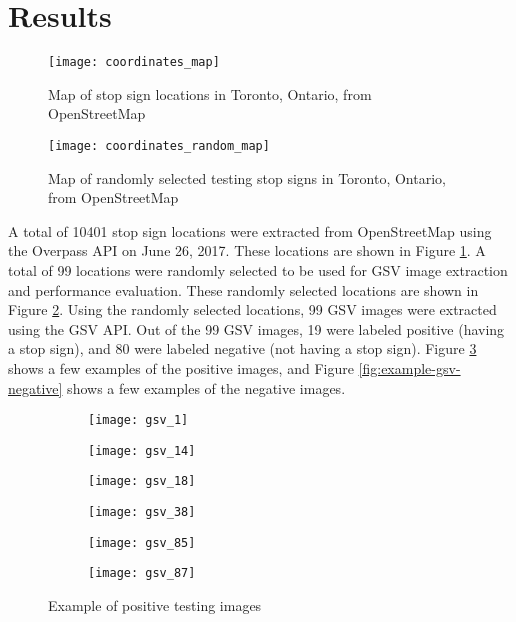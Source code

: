 \section{Results} \label{results}

\begin{figure}[H]
  \texttt{[image: coordinates\_map]}
  \caption{Map of stop sign locations in Toronto, Ontario, from OpenStreetMap}
  \label{fig:map-stop-signs}
\end{figure}

\begin{figure}[H]
  \texttt{[image: coordinates\_random\_map]}
  \caption{Map of randomly selected testing stop signs in Toronto, Ontario, from OpenStreetMap}
  \label{fig:map-random}
\end{figure}

A total of 10401 stop sign locations were extracted from OpenStreetMap using the Overpass API on June 26, 2017. These locations  are shown in Figure \ref{fig:map-stop-signs}. A total of 99 locations were randomly selected to be used for GSV image extraction and performance evaluation. These randomly selected locations are shown in Figure \ref{fig:map-random}. Using the randomly selected locations, 99 GSV images were extracted using the GSV API. Out of the 99 GSV images, 19 were labeled positive (having a stop sign), and 80 were labeled negative (not having a stop sign). Figure \ref{fig:example-gsv-positive} shows a few examples of the positive images, and Figure \ref{fig:example-gsv-negative} shows a few examples of the negative images.

\begin{figure}[H]
  \begin{subfigure}[t]{1.5in}
    \texttt{[image: gsv\_1]}
  \end{subfigure}
  \hfill
  \begin{subfigure}[t]{1.5in}
    \texttt{[image: gsv\_14]}
  \end{subfigure}
  \hfill
  \begin{subfigure}[t]{1.5in}
    \texttt{[image: gsv\_18]}
  \end{subfigure}
  \par\medskip
  \begin{subfigure}[t]{1.5in}
    \texttt{[image: gsv\_38]}
  \end{subfigure}
  \hfill
  \begin{subfigure}[t]{1.5in}
    \texttt{[image: gsv\_85]}
  \end{subfigure}
  \hfill
  \begin{subfigure}[t]{1.5in}
    \texttt{[image: gsv\_87]}
  \end{subfigure}
  \caption{Example of positive testing images}
  \label{fig:example-gsv-positive}
\end{figure}

